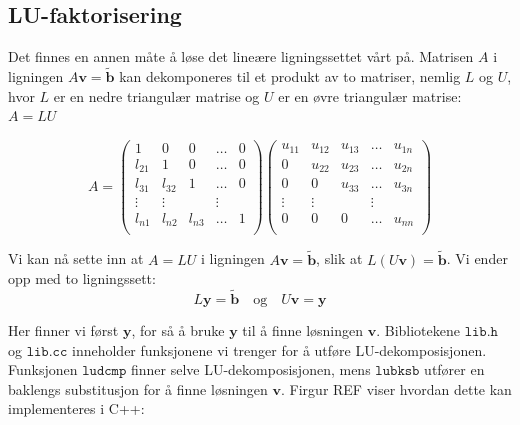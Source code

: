 \documentclass{article}
\begin{document}
\subsection{LU-faktorisering}
Det finnes en annen måte å løse det lineære ligningssettet vårt på. Matrisen $A$ i ligningen $A\textbf{v}=\tilde{\textbf{b}}$ kan dekomponeres til et produkt av to matriser, nemlig $L$ og $U$, hvor $L$ er en nedre triangulær matrise og $U$ er en øvre triangulær matrise: $A=LU$

\begin{equation}
 A = \left(\begin{array}{cccccc}
                          1 & 0 & 0 &\dots    & 0 \\
                           l_{21} & 1 & 0 &\dots &0 \\
                           l_{31} & l_{32} & 1 & \dots &0 \\
                          \vdots  & \vdots   &    &\vdots   \\
                           l_{n1 }& l_{n2}  & l_{n3}  &\dots  &1 \\                         
                      \end{array} \right) 
                      \left(\begin{array}{cccccc}
                          u_{11} & u_{12} & u_{13} &\dots  & u_{1n} \\
                           0 & u_{22} & u_{23} &\dots & u_{2n} \\
                           0 & 0 & u_{33} & \dots & u_{3n} \\
                          \vdots  & \vdots   &    &\vdots   \\
                           0 & 0   & 0  &\dots  & u_{nn} \\                         
                      \end{array} \right)
\end{equation}

Vi kan nå sette inn at $A=LU$ i ligningen $A\textbf{v}=\tilde{\textbf{b}}$, slik at $L(U\textbf{v}) = \tilde{\textbf{b}}$. Vi ender opp med to ligningssett:
\begin{equation}
L\textbf{y} = \tilde{\textbf{b}} \quad \textrm{og} \quad U\textbf{v} = \textbf{y}
\end{equation}

Her finner vi først $\textbf{y}$, for så å bruke $\textbf{y}$ til å finne løsningen $\textbf{v}$. Bibliotekene $\texttt{lib.h}$ og $\texttt{lib.cc}$ inneholder funksjonene vi trenger for å utføre LU-dekomposisjonen. Funksjonen $\texttt{ludcmp}$ finner selve LU-dekomposisjonen, mens $\texttt{lubksb}$ utfører en baklengs substitusjon for å finne løsningen $\textbf{v}$. Firgur REF viser hvordan dette kan implementeres i C++:
\end{document}
